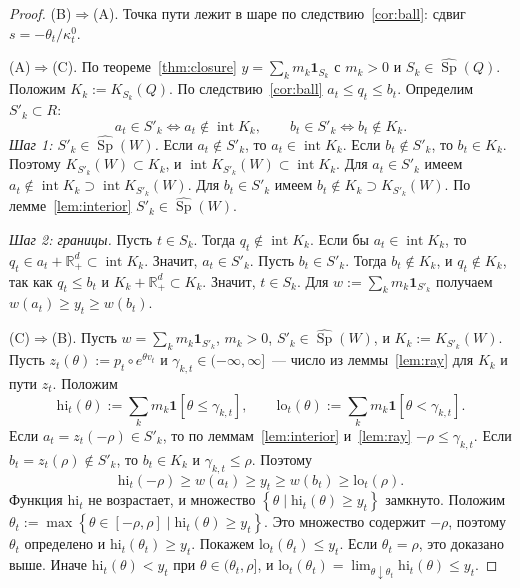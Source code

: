 \documentclass[a4paper,11pt]{article}
\theoremstyle{plain}
\theoremstyle{definition}
\theoremstyle{remark}
\newcommand{\R}{\mathbb{R}}
\newcommand{\set}[1]{\left\{ #1 \right\}}
\newcommand{\Rp}[1][2]{\R^{#1}_{+}}   %
\DeclareMathOperator{\Sp}{Sp}
\DeclareMathOperator{\interior}{int}
\begin{document}
\begin{proof}
    (B)$\Rightarrow$(A). Точка пути лежит в шаре по следствию~\ref{cor:ball}: сдвиг $s=-\theta_t/\kappa^0_t$.

    (A)$\Rightarrow$(C). По теореме~\ref{thm:closure} $y=\sum_km_k\mathbf 1_{S_k}$ с $m_k>0$ и $S_k\in\widehat{\Sp}(Q)$. Положим $K_k:=K_{S_k}(Q)$. По следствию~\ref{cor:ball} $a_t\le q_t\le b_t$. Определим $S'_k\subset R$:
    \[
        a_t\in S'_k\iff a_t\notin\interior K_k,\qquad b_t\in S'_k\iff b_t\notin K_k.
    \]
    \emph{Шаг 1: $S'_k\in\widehat{\Sp}(W)$.} Если $a_t\notin S'_k$, то $a_t\in\interior K_k$. Если $b_t\notin S'_k$, то $b_t\in K_k$. Поэтому $K_{S'_k}(W)\subset K_k$, и $\interior K_{S'_k}(W)\subset\interior K_k$. Для $a_t\in S'_k$ имеем $a_t\notin\interior K_k\supset\interior K_{S'_k}(W)$. Для $b_t\in S'_k$ имеем $b_t\notin K_k\supset K_{S'_k}(W)$. По лемме~\ref{lem:interior} $S'_k\in\widehat{\Sp}(W)$.

    \emph{Шаг 2: границы.} Пусть $t\in S_k$. Тогда $q_t\notin\interior K_k$. Если бы $a_t\in\interior K_k$, то $q_t\in a_t+\Rp[d]\subset\interior K_k$. Значит, $a_t\in S'_k$. Пусть $b_t\in S'_k$. Тогда $b_t\notin K_k$, и $q_t\notin K_k$, так как $q_t\le b_t$ и $K_k+\Rp[d]\subset K_k$. Значит, $t\in S_k$. Для $w:=\sum_km_k\mathbf 1_{S'_k}$ получаем $w(a_t)\ge y_t\ge w(b_t)$.

    (C)$\Rightarrow$(B). Пусть $w=\sum_km_k\mathbf 1_{S'_k}$, $m_k>0$, $S'_k\in\widehat{\Sp}(W)$, и $K_k:=K_{S'_k}(W)$. Пусть $z_t(\theta):=p_t\circ e^{\theta v_t}$ и $\gamma_{k,t}\in(-\infty,\infty]$~--- число из леммы~\ref{lem:ray} для $K_k$ и пути $z_t$. Положим
    \[
        \mathrm{hi}_t(\theta):=\sum_km_k\mathbf 1[\theta\le\gamma_{k,t}],\qquad\mathrm{lo}_t(\theta):=\sum_km_k\mathbf 1[\theta<\gamma_{k,t}].
    \]
    Если $a_t=z_t(-\rho)\in S'_k$, то по леммам~\ref{lem:interior} и~\ref{lem:ray} $-\rho\le\gamma_{k,t}$. Если $b_t=z_t(\rho)\notin S'_k$, то $b_t\in K_k$ и $\gamma_{k,t}\le\rho$. Поэтому
    \[
        \mathrm{hi}_t(-\rho)\ge w(a_t)\ge y_t\ge w(b_t)\ge\mathrm{lo}_t(\rho).
    \]
    Функция $\mathrm{hi}_t$ не возрастает, и множество $\set{\theta\mid\mathrm{hi}_t(\theta)\ge y_t}$ замкнуто. Положим $\theta_t:=\max\set{\theta\in[-\rho,\rho]\mid\mathrm{hi}_t(\theta)\ge y_t}$. Это множество содержит $-\rho$, поэтому $\theta_t$ определено и $\mathrm{hi}_t(\theta_t)\ge y_t$. Покажем $\mathrm{lo}_t(\theta_t)\le y_t$. Если $\theta_t=\rho$, это доказано выше. Иначе $\mathrm{hi}_t(\theta)<y_t$ при $\theta\in(\theta_t,\rho]$, и $\mathrm{lo}_t(\theta_t)=\lim_{\theta\downarrow\theta_t}\mathrm{hi}_t(\theta)\le y_t$.


\end{proof}
\end{document}
